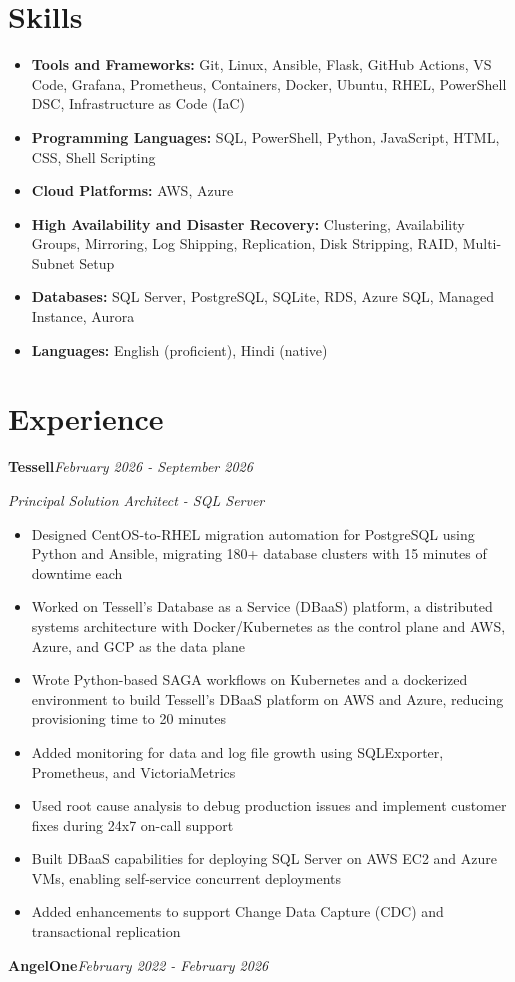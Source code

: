 \documentclass[10pt,a4paper]{article}
\begin{document}
\section{Skills}
\begin{itemize}
  \item \textbf{Tools and Frameworks:} Git, Linux, Ansible, Flask, GitHub Actions, VS Code, Grafana, Prometheus, Containers, Docker, Ubuntu, RHEL, PowerShell DSC, Infrastructure as Code (IaC)
  \item \textbf{Programming Languages:} SQL, PowerShell, Python, JavaScript, HTML, CSS, Shell Scripting
  \item \textbf{Cloud Platforms:} AWS, Azure
  \item \textbf{High Availability and Disaster Recovery:} Clustering, Availability Groups, Mirroring, Log Shipping, Replication, Disk Stripping, RAID, Multi-Subnet Setup
  \item \textbf{Databases:} SQL Server, PostgreSQL, SQLite, RDS, Azure SQL, Managed Instance, Aurora
  \item \textbf{Languages:} English (proficient), Hindi (native)
\end{itemize}

\section{Experience}

\noindent\textbf{Tessell}\hfill \textit{February 2026 - September 2026}

\textit{Principal Solution Architect - SQL Server}\\[-5pt]
\begin{itemize}
  \item Designed CentOS-to-RHEL migration automation for PostgreSQL using Python and Ansible, migrating 180+ database clusters with 15 minutes of downtime each
  \item Worked on Tessell's Database as a Service (DBaaS) platform, a distributed systems architecture with Docker/Kubernetes as the control plane and AWS, Azure, and GCP as the data plane
  \item Wrote Python-based SAGA workflows on Kubernetes and a dockerized environment to build Tessell's DBaaS platform on AWS and Azure, reducing provisioning time to 20 minutes
  \item Added monitoring for data and log file growth using SQLExporter, Prometheus, and VictoriaMetrics
  \item Used root cause analysis to debug production issues and implement customer fixes during 24x7 on-call support
  \item Built DBaaS capabilities for deploying SQL Server on AWS EC2 and Azure VMs, enabling self-service concurrent deployments
  \item Added enhancements to support Change Data Capture (CDC) and transactional replication
\end{itemize}
\vspace{14.7pt}
\noindent\textbf{AngelOne}\hfill \textit{February 2022 - February 2026}
\end{document}
